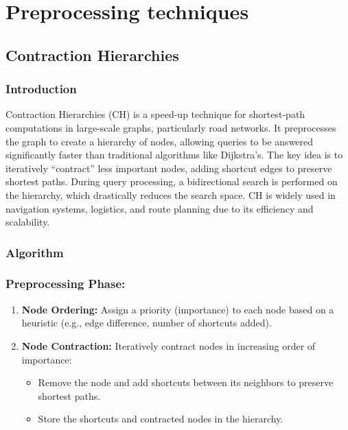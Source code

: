 \section{Preprocessing techniques}
\subsection{Contraction Hierarchies}
	\subsubsection{Introduction}
	Contraction Hierarchies (CH) is a speed-up technique for shortest-path computations in large-scale graphs, particularly road networks. It preprocesses the graph to create a hierarchy of nodes, allowing queries to be answered significantly faster than traditional algorithms like Dijkstra's. The key idea is to iteratively ``contract'' less important nodes, adding shortcut edges to preserve shortest paths. During query processing, a bidirectional search is performed on the hierarchy, which drastically reduces the search space. CH is widely used in navigation systems, logistics, and route planning due to its efficiency and scalability.
	\subsubsection{Algorithm}
	\subsubsection*{Preprocessing Phase:}
	\begin{enumerate}
		\item \textbf{Node Ordering:} Assign a priority (importance) to each node based on a heuristic (e.g., edge difference, number of shortcuts added).
		\item \textbf{Node Contraction:} Iteratively contract nodes in increasing order of importance:
		\begin{itemize}
			\item Remove the node and add shortcuts between its neighbors to preserve shortest paths.
			\item Store the shortcuts and contracted nodes in the hierarchy.
		\end{itemize}
	\end{enumerate}
	

